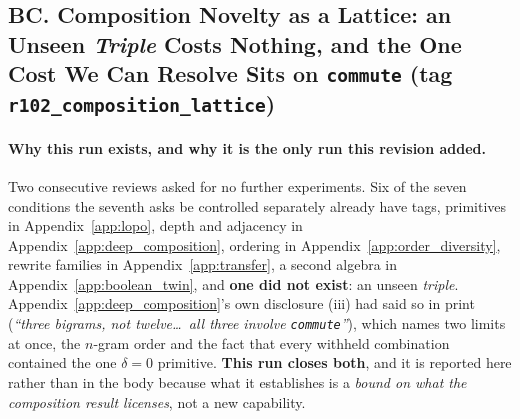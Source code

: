 \subsection*{BC. Composition Novelty as a Lattice: an Unseen \emph{Triple} Costs Nothing, and the One Cost We Can Resolve Sits on \texttt{commute} (tag \texttt{r102\_composition\_lattice})}

\paragraph{Why this run exists, and why it is the only run this revision added.} Two consecutive reviews asked for no further experiments. Six of the seven conditions the seventh asks be controlled separately already have tags, primitives in Appendix~\ref{app:lopo}, depth and adjacency in Appendix~\ref{app:deep_composition}, ordering in Appendix~\ref{app:order_diversity}, rewrite families in Appendix~\ref{app:transfer}, a second algebra in Appendix~\ref{app:boolean_twin}, and \textbf{one did not exist}: an unseen \emph{triple}. Appendix~\ref{app:deep_composition}'s own disclosure (iii) had said so in print (\emph{``three bigrams, not twelve\ldots\ all three involve \texttt{commute}''}), which names two limits at once, the $n$-gram order and the fact that every withheld combination contained the one $\delta{=}0$ primitive. \textbf{This run closes both}, and it is reported here rather than in the body because what it establishes is a \emph{bound on what the composition result licenses}, not a new capability.

